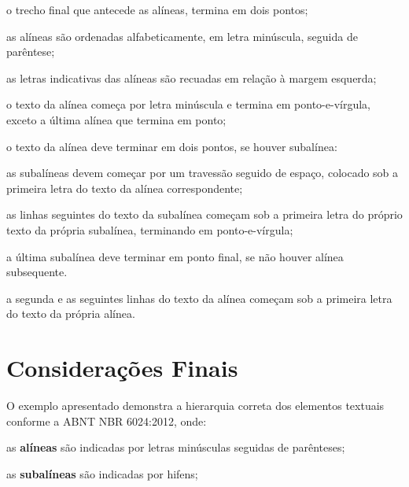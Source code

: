       \begin{alineas}
        \item o trecho final que antecede as alíneas, termina em dois pontos;
        \item as alíneas são ordenadas alfabeticamente, em letra minúscula, seguida de parêntese;
        \item as letras indicativas das alíneas são recuadas em relação à margem esquerda;
        \item o texto da alínea começa por letra minúscula e termina em ponto-e-vírgula, exceto a última alínea que termina em ponto;
        \item o texto da alínea deve terminar em dois pontos, se houver subalínea:
        \begin{subalineas}
          \item as subalíneas devem começar por um travessão seguido de espaço, colocado sob a primeira letra do texto da alínea correspondente;
          \item as linhas seguintes do texto da subalínea começam sob a primeira letra do próprio texto da própria subalínea, terminando em ponto-e-vírgula;
          \item a última subalínea deve terminar em ponto final, se não houver alínea subsequente.
        \end{subalineas}
        \item a segunda e as seguintes linhas do texto da alínea começam sob a primeira letra do texto da própria alínea.
      \end{alineas}

  \section{Considerações Finais}

    O exemplo apresentado demonstra a hierarquia correta dos elementos textuais conforme a ABNT NBR 6024:2012, onde:

    \begin{alineas}
      \item as \textbf{alíneas} são indicadas por letras minúsculas seguidas de parênteses;
      \item as \textbf{subalíneas} são indicadas por hifens;
    \end{alineas}

    \bigskip
